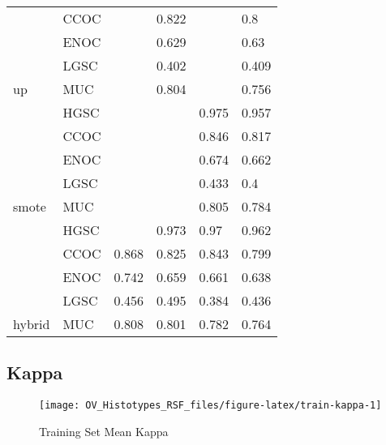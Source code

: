 \documentclass[
]{report}
\begin{document}
\begin{table}
\begin{tabular}[t]{l|l|l|l|l|l}
\cline{2-6}
 & CCOC & \cellcolor[HTML]{FFD700}{0.869} & 0.822 & \cellcolor[HTML]{FFD700}{0.87} & 0.8\\
\cline{2-6}
 & ENOC & \cellcolor[HTML]{FFD700}{0.734} & 0.629 & \cellcolor[HTML]{FFD700}{0.728} & 0.63\\
\cline{2-6}
 & LGSC & \cellcolor[HTML]{FFD700}{0.236} & 0.402 & \cellcolor[HTML]{FFD700}{0.394} & 0.409\\
\cline{2-6}
\multirow{-5}{*}{\raggedright\arraybackslash up} & MUC & \cellcolor[HTML]{FFD700}{0.835} & 0.804 & \cellcolor[HTML]{FFD700}{0.814} & 0.756\\
\cline{1-6}
 & HGSC & \cellcolor[HTML]{FFD700}{0.974} & \cellcolor[HTML]{FFD700}{0.973} & 0.975 & 0.957\\
\cline{2-6}
 & CCOC & \cellcolor[HTML]{FFD700}{0.833} & \cellcolor[HTML]{FFD700}{0.782} & 0.846 & 0.817\\
\cline{2-6}
 & ENOC & \cellcolor[HTML]{FFD700}{0.701} & \cellcolor[HTML]{FFD700}{0.588} & 0.674 & 0.662\\
\cline{2-6}
 & LGSC & \cellcolor[HTML]{FFD700}{0.285} & \cellcolor[HTML]{FFD700}{0.519} & 0.433 & 0.4\\
\cline{2-6}
\multirow{-5}{*}{\raggedright\arraybackslash smote} & MUC & \cellcolor[HTML]{FFD700}{0.827} & \cellcolor[HTML]{FFD700}{0.825} & 0.805 & 0.784\\
\cline{1-6}
 & HGSC & \cellcolor[HTML]{90ee90}{0.977} & 0.973 & 0.97 & 0.962\\
\cline{2-6}
 & CCOC & 0.868 & 0.825 & 0.843 & 0.799\\
\cline{2-6}
 & ENOC & 0.742 & 0.659 & 0.661 & 0.638\\
\cline{2-6}
 & LGSC & 0.456 & 0.495 & 0.384 & 0.436\\
\cline{2-6}
\multirow{-5}{*}{\raggedright\arraybackslash hybrid} & MUC & 0.808 & 0.801 & 0.782 & 0.764\\
\hline
\end{tabular}
\end{table}

\hypertarget{kappa-1}{%
\subsection{Kappa}\label{kappa-1}}

\begin{figure}[H]

{\centering \texttt{[image: OV\_Histotypes\_RSF\_files/figure-latex/train-kappa-1]} 

}

\caption{Training Set Mean Kappa}\label{fig:train-kappa}
\end{figure}
\end{document}
